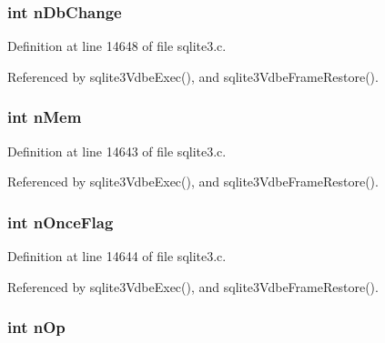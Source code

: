 \subsubsection[{n\+Db\+Change}]{\setlength{\rightskip}{0pt plus 5cm}int n\+Db\+Change}\label{struct_vdbe_frame_a1efef3b338ec76df8eb738429ca474c0}


Definition at line 14648 of file sqlite3.\+c.



Referenced by sqlite3\+Vdbe\+Exec(), and sqlite3\+Vdbe\+Frame\+Restore().

\hypertarget{struct_vdbe_frame_a857d199d972b4d3864ce420c143508e4}{}
\subsubsection[{n\+Mem}]{\setlength{\rightskip}{0pt plus 5cm}int n\+Mem}\label{struct_vdbe_frame_a857d199d972b4d3864ce420c143508e4}


Definition at line 14643 of file sqlite3.\+c.



Referenced by sqlite3\+Vdbe\+Exec(), and sqlite3\+Vdbe\+Frame\+Restore().

\hypertarget{struct_vdbe_frame_a391dfc763758d272dcce42b2b72826a7}{}
\subsubsection[{n\+Once\+Flag}]{\setlength{\rightskip}{0pt plus 5cm}int n\+Once\+Flag}\label{struct_vdbe_frame_a391dfc763758d272dcce42b2b72826a7}


Definition at line 14644 of file sqlite3.\+c.



Referenced by sqlite3\+Vdbe\+Exec(), and sqlite3\+Vdbe\+Frame\+Restore().

\hypertarget{struct_vdbe_frame_a33625b7205f0da4b73ec34d2d4aefd64}{}
\subsubsection[{n\+Op}]{\setlength{\rightskip}{0pt plus 5cm}int n\+Op}\label{struct_vdbe_frame_a33625b7205f0da4b73ec34d2d4aefd64}


